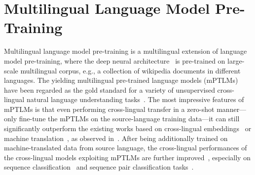 \section{Multilingual Language Model Pre-Training}
Multilingual language model pre-training is a multilingual extension of language model pre-training, where the deep neural architecture~\citep{vaswani2017attention,peters-etal-2018-deep} is pre-trained on large-scale multilingual corpus, e.g., a collection of wikipedia documents in different languages. The yielding multilingual pre-trained language models (mPTLMs)~\citep{che-etal-2018-towards,devlin-etal-2019-bert,conneau2019cross,mulcaire-etal-2019-polyglot,conneau-etal-2020-unsupervised} have been regarded as the gold standard for a variety of unsupervised cross-lingual natural language understanding tasks~\citep{prettenhofer-stein-2010-cross,schwenk-li-2018-corpus,zeman-etal-2018-conll,liu-etal-2019-xqa}. The most impressive features of mPTLMs is that even performing cross-lingual transfer in a zero-shot manner---only fine-tune the mPTLMs on the source-language training data---it can still significantly outperform the existing works based on cross-lingual embeddings~\citep{mikolov2013exploiting,faruqui-dyer-2014-improving,smith2018offline} or machine translation~\citep{banea-etal-2008-multilingual,duh-etal-2011-machine}, as observed in~\citet{pires-etal-2019-multilingual,wu-dredze-2019-beto,keung-etal-2019-adversarial,artetxe-etal-2020-cross}. After being additionally trained on machine-translated data from source language, the cross-lingual performances of the cross-lingual models exploiting mPTLMs are further improved~\citep{huang-etal-2019-unicoder,conneau-etal-2020-unsupervised,cao2020multilingual}, especially on sequence classification~\citep{schwenk-li-2018-corpus} and sequence pair classification tasks~\citep{conneau-etal-2018-xnli,yang-etal-2019-paws}.
